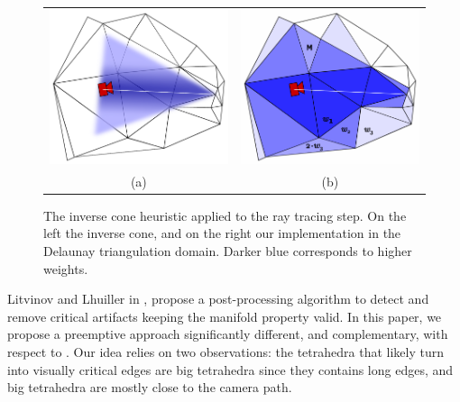 \begin{figure}
\centering
\begin{tabular}{cc}
\includegraphics[width=0.42\columnwidth]{./img/ch-incr-manif/conicCarvingOKCont}&
\includegraphics[width=0.42\columnwidth]{./img//conicCarvingOK}\\
(a) & (b)
\end{tabular}
\caption{The inverse cone heuristic applied to the ray tracing step. On the left the inverse cone, and on the right our implementation in the Delaunay triangulation domain. Darker blue corresponds to higher weights.}
\label{fig:ConicCarving}
\end{figure}



Litvinov and Lhuiller in \cite{litvinov_Lhiuller14}, propose a post-processing algorithm to detect and remove critical artifacts keeping the manifold property valid.
In this paper, we propose a preemptive approach significantly different, and complementary, with respect to \cite{litvinov_Lhiuller14}. 
Our idea relies on two observations: the tetrahedra that likely turn into visually critical edges are big tetrahedra since they contains long edges, and big tetrahedra are mostly close to the camera path.





